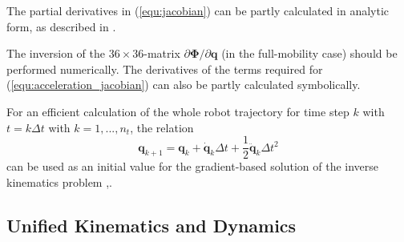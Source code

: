 \documentclass[fleqn,a4paper,10pt]{article}
\newcommand{\bm}[1]{\mathbf{#1}}
\renewcommand{\Phi}[1]{\varPhi{#1}}
\begin{document}
\begin{multicols}{2}
The partial derivatives in (\ref{equ:jacobian}) can be partly  calculated in analytic form, as described in \cite{SchapplerTapOrt2019c}.

The inversion of the $36 \times 36$-matrix $\partial \bm{\Phi} / \partial \bm{q}$ (in the full-mobility case) should be performed numerically.
The derivatives of the terms required for (\ref{equ:acceleration_jacobian}) can also be partly calculated symbolically.

For an efficient calculation of the whole robot trajectory for time step $k$ with $t=k \Delta t$ with $k=1,...,n_t$, the relation
%
\begin{equation}
\bm{q}_{k+1}=\bm{q}_k+\dot{\bm{q}}_k \Delta t+\frac{1}{2}\ddot{\bm{q}}_k\Delta t^2
\label{equ:IK_initialvalue}
\end{equation}
%
can be used as an initial value for the gradient-based solution of the inverse kinematics problem \cite{KhalilDom2002},\cite{SchapplerTapOrt2019c}.

\subsection{Unified Kinematics and Dynamics}
\label{sec:kindyn}





\end{multicols}
\end{document}

